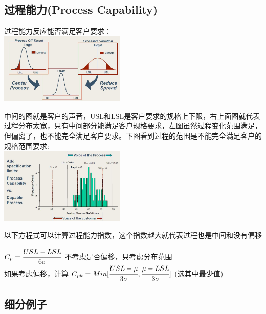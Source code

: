 \hypertarget{ux8fc7ux7a0bux80fdux529bprocess-capability-1}{%
\subsection{过程能力(Process
Capability)}\label{ux8fc7ux7a0bux80fdux529bprocess-capability-1}}

过程能力反应能否满足客户要求：\\

\includegraphics[width=6cm]{DAD_p9.jpg}

中间的图就是客户的声音，USL和LSL是客户要求的规格上下限，右上面图就代表过程分布太宽，只有中间部分能满足客户规格要求，左图虽然过程变化范围满足，但偏离了，也不能完全满足客户要求。下图看到过程的范围是不能完全满足客户的规格范围要求:\\

\includegraphics[width=6cm]{DAD_p57.jpg}

以下方程式可以计算过程能力指数，这个指数越大就代表过程也是中间和没有偏移




\(C_p = \cfrac{USL - LSL}{6 \sigma}\) 不考虑是否偏移，只考虑分布范围\\
如果考虑偏移，计算
\(C_{pk} = Min [ \cfrac{USL - \mu}{3 \sigma} , \cfrac{\mu - LSL}{3 \sigma} ]\)
(选其中最少值)\\

\hypertarget{ux7ec6ux5206ux4f8bux5b50}{%
\subsection{细分例子}\label{ux7ec6ux5206ux4f8bux5b50}}

